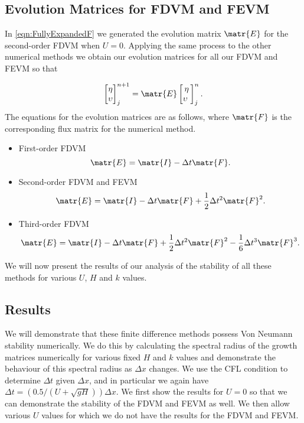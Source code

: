\subsection{Evolution Matrices for FDVM and FEVM }
In \eqref{eqn:FullyExpandedF} we generated the evolution matrix $\matr{E}$ for the second-order FDVM when $U=0$. Applying the same process to the other numerical methods we obtain our evolution matrices for all our FDVM and FEVM so that

\begin{equation}
\begin{bmatrix}
\eta \\
\upsilon\\
\end{bmatrix}^{n+1}_j = \matr{E}  \begin{bmatrix}
\eta\\
\upsilon\
\end{bmatrix}^{n}_j .
\end{equation}
The equations for the evolution matrices are as follows, where $\matr{F}$ is the corresponding flux matrix for the numerical method.
\begin{itemize}
	\item First-order FDVM
	\[\matr{E} = \matr{I} - \Delta t \matr{F}. \]
	\item Second-order FDVM and FEVM
	\[\matr{E} = \matr{I} - \Delta t \matr{F} + \frac{1}{2} \Delta t^2 \matr{F}^2.\]
	\item Third-order FDVM
	\[\matr{E} = \matr{I} - \Delta t \matr{F} + \frac{1}{2} \Delta t^2 \matr{F}^2 - \frac{1}{6} \Delta t^3 \matr{F}^3.\]
\end{itemize}

We will now present the results of our analysis of the stability of all these methods for various $U$, $H$ and $k$ values. 

\subsection{Results}
We will demonstrate that these finite difference methods possess Von Neumann stability numerically. We do this by calculating the spectral radius of the growth matrices numerically for various fixed $H$ and $k$ values and demonstrate the behaviour of this spectral radius as $\Delta x$ changes. We use the CFL condition to determine $\Delta t$ given $\Delta x$, and in particular we again have $\Delta t =   \left( 0.5 / \left(U + \sqrt{gH}\right) \right) {\Delta x} $. We first show the results for $U = 0$ so that we  can demonstrate the stability of the FDVM and FEVM as well. We then allow various $U$ values for which we do not have the results for the FDVM and FEVM.

